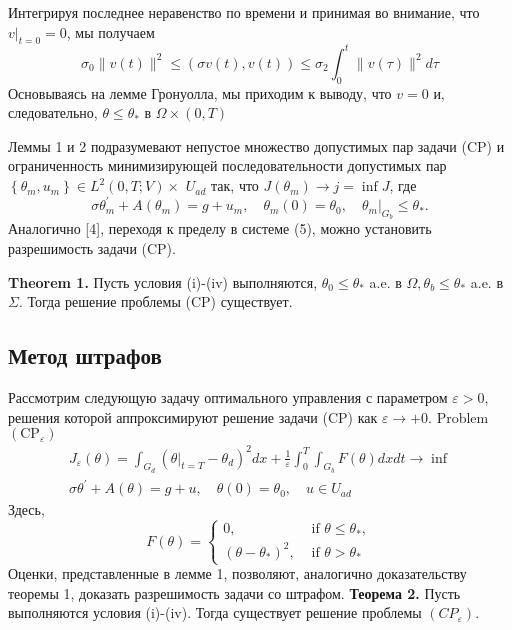 Интегрируя последнее неравенство по времени и принимая во внимание, что $\left.v\right|_{t=0}=0$, мы получаем
\[
    \sigma_{0}\|v(t)\|^{2} \leq(\sigma v(t), v(t)) \leq \sigma_{2} \int_{0}^{t}\|v(\tau)\|^{2} d \tau
\]
Основываясь на лемме Гронуолла, мы приходим к выводу, что $v=0$ и, следовательно,
$\theta \leq \theta_{*}$ в $\Omega \times(0, T)$

Леммы 1 и 2 подразумевают непустое множество допустимых пар задачи (CP)
и ограниченность минимизирующей последовательности допустимых пар
$\left\{\theta_{m}, u_{m}\right\} \in L^{2}(0, T ; V) \times$
$U_{a d}$ так, что $J\left(\theta_{m}\right) \rightarrow j=\inf J$, где
\[
    \sigma \theta_{m}^{\prime}+A\left(\theta_{m}\right)=g+u_{m},
    \quad \theta_{m}(0)=\theta_{0},\left.\quad \theta_{m}\right|_{G_{b}} \leq \theta_{*}.
\]
Аналогично [4], переходя к пределу в системе (5), можно установить разрешимость задачи (CP).

\textbf{Theorem 1.}
Пусть условия (i)-(iv) выполняются,
$\theta_{0} \leq \theta_{*}$ a.e. в $\Omega, \theta_{b} \leq \theta_{*}$ a.e. в $\Sigma$.
Тогда решение проблемы (CP) существует.

\subsection{Метод штрафов}
Рассмотрим следующую задачу оптимального управления с параметром $\varepsilon>0$,
решения которой аппроксимируют решение задачи (CP) как $\varepsilon \rightarrow+0$.
Problem $\left(\mathrm{CP}_{\varepsilon}\right)$
\[
    \begin{gathered}
        J_{\varepsilon}(\theta)=\int_{G_{d}}\left(\left.\theta\right|_{t=T}-\theta_{d}\right)^{2} d x+\frac{1}{\varepsilon} \int_{0}^{T} \int_{G_{b}} F(\theta) d x d t \rightarrow \inf \\
        \sigma \theta^{\prime}+A(\theta)=g+u, \quad \theta(0)=\theta_{0}, \quad u \in U_{a d}
    \end{gathered}
\]
Здесь,
\[
    F(\theta)=
    \begin{cases}
        0, & \text { if } \theta \leq \theta_{*}, \\
        \left(\theta-\theta_{*}\right)^{2}, & \text { if } \theta>\theta_{*}
    \end{cases}
\]
Оценки, представленные в лемме 1, позволяют, аналогично доказательству теоремы 1, доказать разрешимость задачи со штрафом.
\textbf{Теорема 2.} Пусть выполняются условия (i)-(iv).
Тогда существует решение проблемы $\left(C P_{\varepsilon}\right)$.

